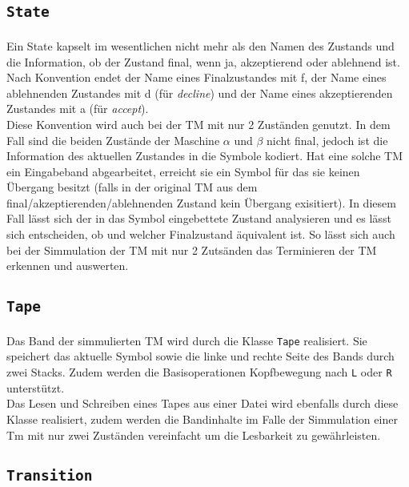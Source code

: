 \documentclass[10pt, a4paper]{article}
\newcommand{\ilc}{\texttt}
\begin{document}
\subsection*{\ilc{State}}
\paragraph*{}
Ein State kapselt im wesentlichen nicht mehr als den Namen des Zustands und die Information, ob der Zustand final, wenn ja, akzeptierend oder ablehnend ist. Nach Konvention endet der Name eines Finalzustandes mit f, der Name eines ablehnenden Zustandes mit d (für \textit{decline}) und der Name eines akzeptierenden Zustandes mit a (für \textit{accept}).\\
Diese Konvention wird auch bei der TM mit nur 2 Zuständen genutzt. In dem Fall sind die beiden Zustände der Maschine $\alpha$ und $\beta$ nicht final, jedoch ist die Information des aktuellen Zustandes in die Symbole kodiert. Hat eine solche TM ein Eingabeband abgearbeitet, erreicht sie ein Symbol für das sie keinen Übergang besitzt (falls in der original TM aus dem final/akzeptierenden/ablehnenden Zustand kein Übergang exisitiert). In diesem Fall lässt sich der in das Symbol eingebettete Zustand analysieren und es lässt sich entscheiden, ob und welcher Finalzustand äquivalent ist. So lässt sich auch bei der Simmulation der TM mit nur 2 Zutsänden das Terminieren der TM erkennen und auswerten.\par

\subsection*{\ilc{Tape}}
\paragraph*{}
Das Band der simmulierten TM wird durch die Klasse \ilc{Tape} realisiert. Sie speichert das aktuelle Symbol sowie die linke und rechte Seite des Bands durch zwei Stacks. Zudem werden die Basisoperationen Kopfbewegung nach \ilc{L} oder \ilc{R} unterstützt.\\
Das Lesen und Schreiben eines Tapes aus einer Datei wird ebenfalls durch diese Klasse realisiert, zudem werden die Bandinhalte im Falle der Simmulation einer Tm mit nur zwei Zuständen vereinfacht um die Lesbarkeit zu gewährleisten.\par

\subsection*{\ilc{Transition}}
\end{document}
